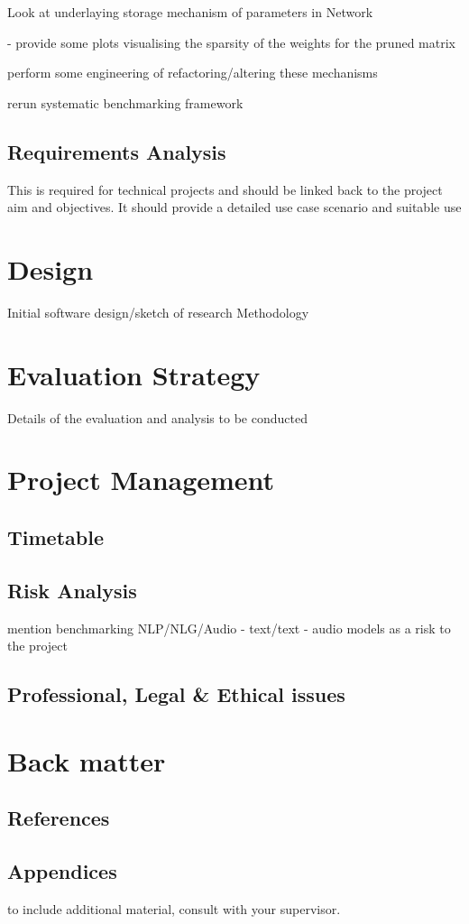 \documentclass[11pt]{article}
\begin{document}
Look at underlaying storage mechanism of parameters in Network

 - provide some plots visualising the sparsity of the weights for the pruned matrix

perform some engineering of refactoring/altering these mechanisms

rerun systematic benchmarking framework





\subsection{Requirements Analysis}
This is required for technical projects and should be linked
back to the project aim and objectives. It should provide a detailed use case scenario
and suitable use

\pagebreak
\section{Design}
Initial software design/sketch of research Methodology

\pagebreak
\section{Evaluation Strategy}
Details of the evaluation and analysis to be conducted

\pagebreak
\section{Project Management}
\subsection{Timetable}

\subsection{Risk Analysis}

mention benchmarking NLP/NLG/Audio - text/text - audio models as a risk to the project

\subsection{Professional, Legal \& Ethical issues}

\pagebreak
\appendix
\section{Back matter}
\subsection{References}
\printbibliography

\subsection{Appendices}
to include additional material, consult with your supervisor.\\

\printnoidxglossary[type=acronym]
\printacronyms
\end{document}
